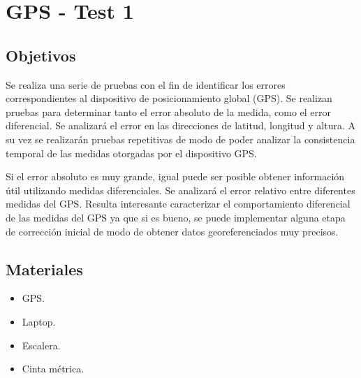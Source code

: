 \documentclass[spanish,12pt,a4paper,titlepage]{report}
\begin{document}
\chapter{GPS - Test 1}
\label{chap-gps-test-1}

\section{Objetivos}

Se realiza una serie de pruebas con el fin de identificar los errores correspondientes al dispositivo de posicionamiento global (GPS). Se realizan pruebas para determinar tanto el error absoluto de la medida, como el error diferencial. Se analizará el error en las direcciones de latitud, longitud y altura. A su vez se realizarán pruebas repetitivas de modo de poder analizar la consistencia temporal de las medidas otorgadas por el dispositivo GPS.

Si el error absoluto es muy grande, igual puede ser posible obtener información útil utilizando medidas diferenciales. Se analizará el error relativo entre diferentes medidas del GPS. Resulta interesante caracterizar el comportamiento diferencial de las medidas del GPS ya que si es bueno, se puede implementar alguna etapa de corrección inicial de modo de obtener datos georeferenciados muy precisos.

%
%

\section{Materiales}

\begin{itemize}
\item GPS.
\item Laptop.
\item Escalera.
\item Cinta métrica.
\end{itemize}
\end{document}
